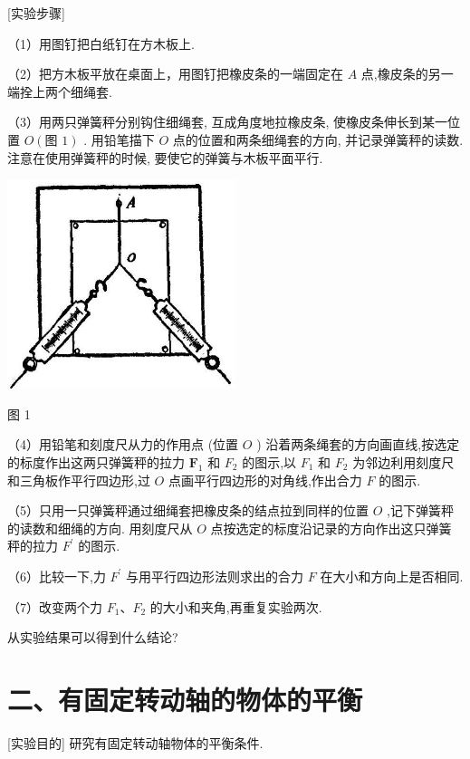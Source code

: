 \documentclass[10pt]{article}
\begin{document}
[实验步骤]

（1）用图钉把白纸钉在方木板上.

（2）把方木板平放在桌面上，用图钉把橡皮条的一端固定在 \(A\) 点,橡皮条的另一端拴上两个细绳套.

（3）用两只弹簧秤分别钩住细绳套, 互成角度地拉橡皮条, 使橡皮条伸长到某一位置 \(O\left( \text{图 1}\right)\) . 用铅笔描下 \(O\) 点的位置和两条细绳套的方向, 并记录弹簧秤的读数. 注意在使用弹簧秤的时候, 要使它的弹簧与木板平面平行.

\begin{center}
\includegraphics[max width=0.5\textwidth]{images/01912d55-147c-70aa-b0e0-1782a122f948_314_679379.jpg}
\end{center}

图 1

（4）用铅笔和刻度尺从力的作用点 (位置 \(O\) ) 沿着两条绳套的方向画直线,按选定的标度作出这两只弹簧秤的拉力 \({\mathbf{F}}_{1}\) 和 \({F}_{2}\) 的图示,以 \({F}_{1}\) 和 \({F}_{2}\) 为邻边利用刻度尺和三角板作平行四边形,过 \(O\) 点画平行四边形的对角线,作出合力 \(F\) 的图示.

（5）只用一只弹簧秤通过细绳套把橡皮条的结点拉到同样的位置 \(O\) ,记下弹簧秤的读数和细绳的方向. 用刻度尺从 \(O\) 点按选定的标度沿记录的方向作出这只弹簧秤的拉力 \({F}^{\prime }\) 的图示.

（6）比较一下,力 \({F}^{\prime }\) 与用平行四边形法则求出的合力 \(F\) 在大小和方向上是否相同.

（7）改变两个力 \({F}_{1}\text{、}{F}_{2}\) 的大小和夹角,再重复实验两次.

从实验结果可以得到什么结论?

\section*{二、有固定转动轴的物体的平衡}

[实验目的] 研究有固定转动轴物体的平衡条件.
\end{document}
